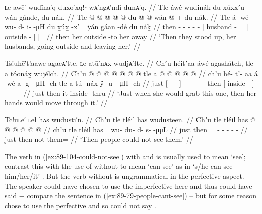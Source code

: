 \ex\label{ex:89-102-husbands-leave}%
%
\begingl
	\glpreamble	ʟe awē′ wudîna′q duxo′xq!ᵘ wᴀ′ng̣ᴀ′ndî dunᴀ′q. //
	\glpreamble	Tle áwé wudináḵ du x̱úx̱xʼu wán gánde, du náḵ. //
	\gla	Tle  @ {}
		 @ {} @ {} @ {} @ {}
		{} du  @ {} @ \•wán {}
		{}  @ {} {} +
		{} du náḵ. {} //
	\glb	Tle á -wé
		wu- d- i-  -μH
		{} du x̱úx̱ -xʼ =ÿán {}
		{} gáan -dé {}
		{} du náḵ {} //
	\glc	then  -
		- - -  -
		{}[  husband - = {}]
		{}[ outside - {}]
		{}[   {}] //
	\gld	then  {}
		 {} {} {} {}
		{} her  {} {} {}
		{} outside -to {}
		{} her away {} //
	\glft	‘Then they stood up, her husbands, going outside and leaving her.’
		//
\endgl
\xe

\ex\label{ex:89-103-grab-through}%
%
\begingl
	\glpreamble	Ts!uhē′t!aawe ag̣acᴀ′ttc, ʟe atū′nᴀx wudjᴀ′łtc. //
	\glpreamble	Chʼu héitʼaa áwé ag̱ashátch, tle a tóonáx̱ wujélch. //
	\gla	Chʼu {}  @ {} @ {} {}  @ {}
		 @ {} @ {} @ {} @ {}
		tle {} a  @ {} {}
		 @ {} @ {} @ {} @ {} //
	\glb	chʼu {} hé- tʼ- aa {} á -wé
		a- g̱-  -μH -ch
		tle {} a tú -náx̱ {}
		ÿ- u-  -μH -ch //
	\glc	just {}[ - -  {}]  -
		- -  - -
		then {}[  inside - {}]
		- -  - - //
	\gld	just {}  {} {} {}  {}
		 {} {} {} {}
		then {} it inside -thru {}
		 {} {} {} //
	\glft	‘Just when she would grab this one, then her hands would move through it.’
		//
\endgl
\xe

\ex\label{ex:89-104-could-not-see}%
%
\begingl
	\glpreamble	Tc!uʟe′ ʟēł hᴀs wudustī′n. //
	\glpreamble	Chʼu tle tléil has wudusteen. //
	\gla	Chʼu tle tléil has @  @ {} @ {} @ {} @ {} @ {} //
	\glb	chʼu tle tléil has= wu- du- d- s-  -μμL //
	\glc	just then  = - - - -  - //
	\gld	just then not them=  {} {} {} {} {} //
	\glft	‘Then people could not see them.’
		//
\endgl
\xe

The verb in (\ref{ex:89-104-could-not-see}) with  and  is usually used to mean ‘see’; contrast this with the use of  without  to mean ‘can see’ as in  ‘s/he can see him/her/it’ \parencite[242]{edwards:2009}.
But the verb without  is ungrammatical in the perfective aspect.
The speaker could have chosen to use the imperfective here and thus could have said  − compare the sentence  in (\ref{ex:89-79-people-cant-see}) – but for some reason chose to use the perfective and so could not say .

